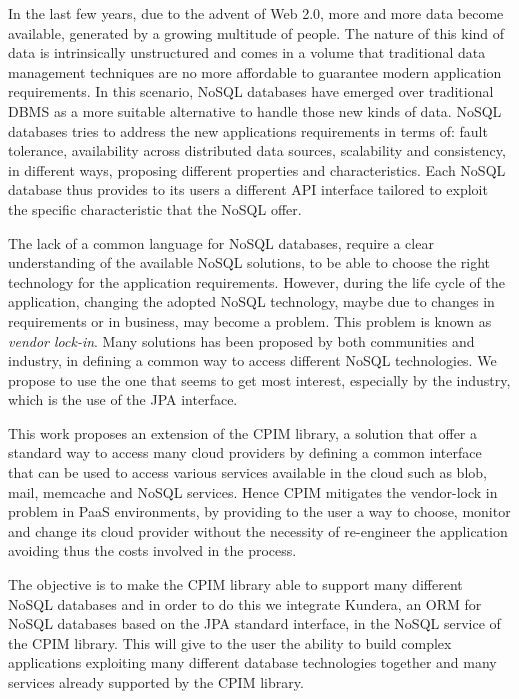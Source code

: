 In the last few years, due to the advent of Web 2.0, more and more data become available, generated by a growing multitude of people. The nature of this kind of data is intrinsically unstructured and comes in a volume that traditional data management techniques are no more affordable to guarantee modern application requirements.
In this scenario, NoSQL databases have emerged over traditional DBMS as a more suitable alternative to handle those new kinds of data. NoSQL databases tries to address the new applications requirements in terms of: fault tolerance, availability across distributed data sources, scalability and consistency, in different ways, proposing different properties and characteristics. 
Each NoSQL database thus provides to its users a different API interface tailored to exploit the specific characteristic that the NoSQL offer.

\noindent The lack of a common language for NoSQL databases, require a clear understanding of the available NoSQL solutions, to be able to choose the right technology for the application requirements. However, during the life cycle of the application, changing the adopted NoSQL technology, maybe due to changes in requirements or in business, may become a problem. This problem is known as \textit{vendor lock-in}. Many solutions has been proposed by both communities and industry, in defining a common way to access different NoSQL technologies. We propose to use the one that seems to get most interest, especially by the industry, which is the use of the JPA interface.

\noindent This work proposes an extension of the CPIM library, a solution that offer a standard way to access many cloud providers by defining a common interface that can be used to access various services available in the cloud such as blob, mail, memcache and NoSQL services. Hence CPIM mitigates the vendor-lock in problem in PaaS environments, by providing to the user a way to choose, monitor and change its cloud provider without the necessity of re-engineer the application avoiding thus the costs involved in the process.

\noindent The objective is to make the CPIM library able to support many different NoSQL databases and in order to do this we integrate Kundera, an ORM for NoSQL databases based on the JPA standard interface, in the NoSQL service of the CPIM library. This will give to the user the ability to build complex applications exploiting many different database technologies together and many services already supported by the CPIM library.

